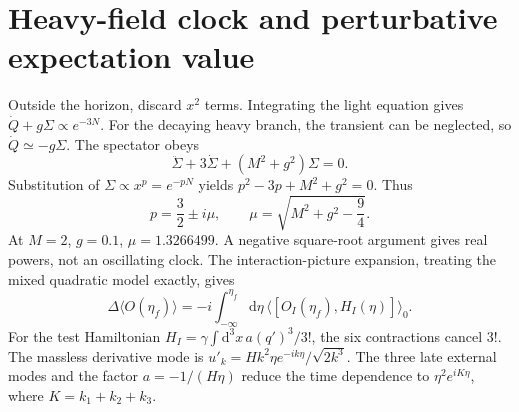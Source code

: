 \documentclass[11pt,a4paper]{article}
\newcommand{\dd}{\mathrm{d}}
\begin{document}
\section{Heavy-field clock and perturbative expectation value}
Outside the horizon, discard $x^2$ terms. Integrating the light equation gives $\dot Q+g\Sigma\propto e^{-3N}$. For the decaying heavy branch, the transient can be neglected, so $\dot Q\simeq-g\Sigma$. The spectator obeys
\begin{equation}\ddot\Sigma+3\dot\Sigma+(M^2+g^2)\Sigma=0.\end{equation}
Substitution of $\Sigma\propto x^p=e^{-pN}$ yields $p^2-3p+M^2+g^2=0$. Thus
\begin{equation}p=\frac32\pm i\mu,\qquad \mu=\sqrt{M^2+g^2-\frac94}.\end{equation}
At $M=2$, $g=0.1$, $\mu=1.3266499$. A negative square-root argument gives real powers, not an oscillating clock.
The interaction-picture expansion, treating the mixed quadratic model exactly, gives
\begin{equation}\Delta\langle O(\eta_f)\rangle=-i\int_{-\infty}^{\eta_f}\dd\eta\,\langle[O_I(\eta_f),H_I(\eta)]\rangle_0.\end{equation}
For the test Hamiltonian $H_I=\gamma\int\dd^3x\,a(q')^3/3!$, the six contractions cancel $3!$. The massless derivative mode is $u'_k=Hk^2\eta e^{-ik\eta}/\sqrt{2k^3}$. The three late external modes and the factor $a=-1/(H\eta)$ reduce the time dependence to $\eta^2 e^{iK\eta}$, where $K=k_1+k_2+k_3$.

\newpage
\end{document}
